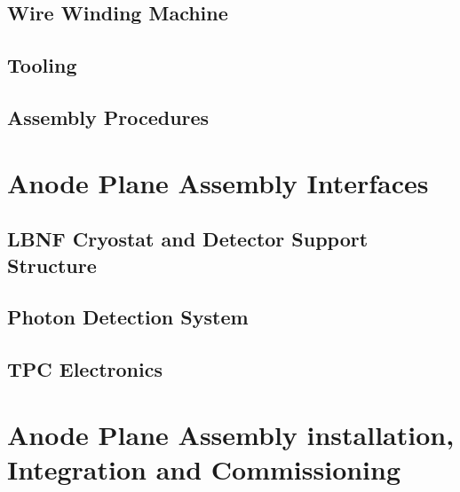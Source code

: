 \subsection{Wire Winding Machine}
\label{sec:fdsp-apa-winding}


\subsection{Tooling}
\label{sec:fdsp-apa-tooling}


\subsection{Assembly Procedures}
\label{sec:fdsp-apa-assy}




\section{Anode Plane Assembly Interfaces}
\label{sec:fdsp-apa-intfc}


\subsection{LBNF Cryostat and Detector Support Structure}
\label{sec:fdsp-apa-intfc-lbnf-dss}


\subsection{Photon Detection System}
\label{sec:fdsp-apa-intfc-pds}


\subsection{TPC Electronics}
\label{sec:fdsp-apa-intfc-elec}




\section{Anode Plane Assembly installation, Integration and Commissioning}
\label{sec:fdsp-apa-install}

